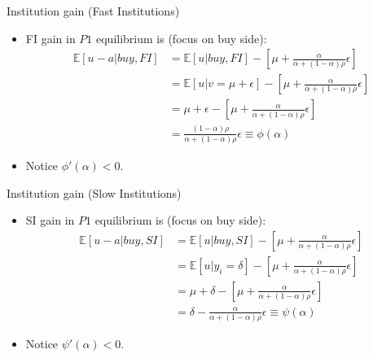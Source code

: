 \documentclass[english,10pt
,aspectratio=169
]{beamer}
\begin{document}
\begin{frame}{Institution gain (Fast Institutions)}
	\begin{itemize}
		\item FI gain in $P1$ equilibrium is (focus on buy side):
		\begin{align*}
		\mathbb{E}[u-a|buy, FI]
		& = \mathbb{E}[u|buy, FI] - \left[\mu + \frac{\alpha}{\alpha+(1-\alpha)\rho} \epsilon\right] \\
		& = \mathbb{E}[u|v=\mu+\epsilon] - \left[\mu + \frac{\alpha}{\alpha+(1-\alpha)\rho} \epsilon\right] \\
		& = \mu+\epsilon - \left[\mu + \frac{\alpha}{\alpha+(1-\alpha)\rho} \epsilon\right] \\
		& = \frac{(1-\alpha)\rho}{\alpha+(1-\alpha)\rho} \epsilon \equiv \phi(\alpha)
		\end{align*}
		\item Notice $\phi'(\alpha)<0$.
	\end{itemize}
\end{frame}


\begin{frame}{Institution gain (Slow Institutions)}
	\begin{itemize}
		\item SI gain in $P1$ equilibrium is (focus on buy side):
		\begin{align*}
		\mathbb{E}[u-a|buy, SI]
		& = \mathbb{E}[u|buy, SI] - \left[\mu + \frac{\alpha}{\alpha+(1-\alpha)\rho} \epsilon\right] \\
		& = \mathbb{E}[u|y_{i}=\delta] - \left[\mu + \frac{\alpha}{\alpha+(1-\alpha)\rho} \epsilon\right] \\
		& = \mu+\delta - \left[\mu + \frac{\alpha}{\alpha+(1-\alpha)\rho} \epsilon\right] \\
		& = \delta -  \frac{\alpha}{\alpha+(1-\alpha)\rho} \epsilon \equiv \psi(\alpha)
		\end{align*}
		\item Notice $\psi'(\alpha)<0$.
	\end{itemize}
\end{frame}
\end{document}
